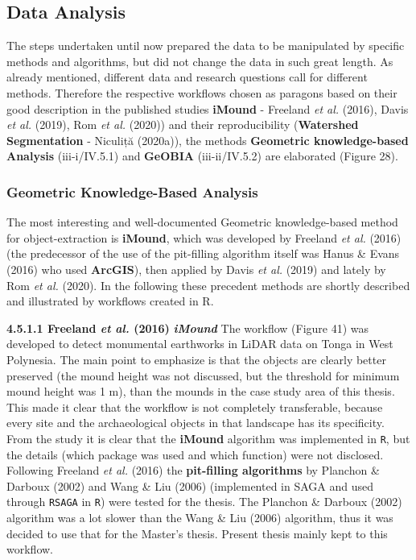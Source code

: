 \documentclass[
  12pt,
]{article}
\begin{document}
\hypertarget{data-analysis}{%
\subsection{\texorpdfstring{\textbf{Data Analysis}}{Data Analysis}}\label{data-analysis}}

The steps undertaken until now prepared the data to be manipulated by specific methods and algorithms, but did not change the data in such great length.
As already mentioned, different data and research questions call for different methods. Therefore the respective workflows chosen as paragons based on their good description in the published studies \textbf{iMound} - Freeland \emph{et al.} (2016), Davis \emph{et al.} (2019), Rom \emph{et al.} (2020)) and their reproducibility (\textbf{Watershed Segmentation} - Niculiță (2020a)), the methods \textbf{Geometric knowledge-based Analysis} (iii-i/IV.5.1) and \textbf{GeOBIA} (iii-ii/IV.5.2) are elaborated (Figure 28).

\hypertarget{geometric-knowledge-based-analysis}{%
\subsubsection{\texorpdfstring{\textbf{Geometric Knowledge-Based Analysis}}{Geometric Knowledge-Based Analysis}}\label{geometric-knowledge-based-analysis}}

The most interesting and well-documented Geometric knowledge-based method for object-extraction is \textbf{iMound}, which was developed by Freeland \emph{et al.} (2016) (the predecessor of the use of the pit-filling algorithm itself was Hanus \& Evans (2016) who used \textbf{ArcGIS}), then applied by Davis \emph{et al.} (2019) and lately by Rom \emph{et al.} (2020). In the following these precedent methods are shortly described and illustrated by workflows created in R.

\textbf{4.5.1.1 Freeland \emph{et al.} (2016)} \textbf{\emph{iMound}}
\newline
The workflow (Figure 41) was developed to detect monumental earthworks in LiDAR data on Tonga in West Polynesia. The main point to emphasize is that the objects are clearly better preserved (the mound height was not discussed, but the threshold for minimum mound height was 1 m), than the mounds in the case study area of this thesis. This made it clear that the workflow is not completely transferable, because every site and the archaeological objects in that landscape has its specificity. From the study it is clear that the \textbf{iMound} algorithm was implemented in \texttt{R}, but the details (which package was used and which function) were not disclosed. Following Freeland \emph{et al.} (2016) the \textbf{pit-filling algorithms} by Planchon \& Darboux (2002) and Wang \& Liu (2006) (implemented in SAGA and used through \texttt{RSAGA} in \texttt{R}) were tested for the thesis. The Planchon \& Darboux (2002) algorithm was a lot slower than the Wang \& Liu (2006) algorithm, thus it was decided to use that for the Master's thesis. Present thesis mainly kept to this workflow.
\end{document}
